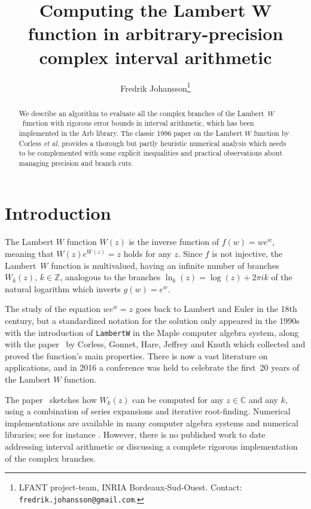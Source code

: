 \documentclass[11pt,a4paper]{article}
\begin{document}
\title{Computing the Lambert W function in arbitrary-precision complex interval arithmetic}
\author{Fredrik Johansson\footnote{LFANT project-team, INRIA Bordeaux-Sud-Ouest. Contact: \texttt{fredrik.johansson@gmail.com}. }}
\date{}
\maketitle

\begin{abstract}
We describe an algorithm to evaluate all the complex branches
of the Lambert~$W$~function
with rigorous error bounds in interval arithmetic,
which has been implemented
in the Arb library. The classic 1996 paper on the Lambert $W$ function
by Corless \emph{et al.} provides a thorough but partly heuristic
numerical analysis which needs to be complemented
with some explicit inequalities and practical observations about
managing precision and branch cuts.
\end{abstract}

\section{Introduction}

The Lambert $W$ function $W(z)$ is the inverse function of $f(w) = w e^w$,
meaning that $W(z) e^{W(z)} = z$ holds for any $z$.
Since $f$ is not injective, the Lambert~$W$ function is multivalued,
having an infinite number of branches $W_k(z)$, $k \in \mathbb{Z}$,
analogous to the branches $\ln_k(z) = \log(z) + 2 \pi i k$
of the natural logarithm which inverts
$g(w) = e^w$.

The study of the equation $w e^w = z$
goes back to Lambert and Euler in the 18th century,
but a standardized notation for the solution
only appeared in the 1990s with the introduction of \texttt{LambertW}
in the Maple computer algebra system, along with the paper~\cite{corless1996lambertw}
by Corless, Gonnet, Hare, Jeffrey and Knuth which collected and proved
the function's main properties.
There is now a vast literature on applications,
and in 2016 a conference was held to celebrate the first~20 years
of the Lambert $W$ function.

The paper~\cite{corless1996lambertw}
sketches how $W_k(z)$ can be computed for any
$z \in \mathbb{C}$ and any $k$, using a combination of series
expansions and iterative root-finding.
Numerical implementations
are available
in many computer algebra systems and numerical libraries; see
for instance \cite{lawrence2012algorithm,chapeau2002numerical,veberivc2012lambert}.
However, there is no published work to date
addressing interval arithmetic or
discussing a complete rigorous implementation of the complex branches.
\end{document}
